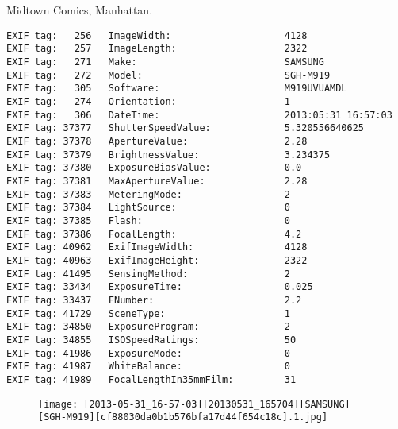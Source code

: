 \section{\protect{}}
\noindent Midtown Comics, Manhattan.
\noindent
\begin{lstlisting}
EXIF tag:   256   ImageWidth:                    4128
EXIF tag:   257   ImageLength:                   2322
EXIF tag:   271   Make:                          SAMSUNG
EXIF tag:   272   Model:                         SGH-M919
EXIF tag:   305   Software:                      M919UVUAMDL
EXIF tag:   274   Orientation:                   1
EXIF tag:   306   DateTime:                      2013:05:31 16:57:03
EXIF tag: 37377   ShutterSpeedValue:             5.320556640625
EXIF tag: 37378   ApertureValue:                 2.28
EXIF tag: 37379   BrightnessValue:               3.234375
EXIF tag: 37380   ExposureBiasValue:             0.0
EXIF tag: 37381   MaxApertureValue:              2.28
EXIF tag: 37383   MeteringMode:                  2
EXIF tag: 37384   LightSource:                   0
EXIF tag: 37385   Flash:                         0
EXIF tag: 37386   FocalLength:                   4.2
EXIF tag: 40962   ExifImageWidth:                4128
EXIF tag: 40963   ExifImageHeight:               2322
EXIF tag: 41495   SensingMethod:                 2
EXIF tag: 33434   ExposureTime:                  0.025
EXIF tag: 33437   FNumber:                       2.2
EXIF tag: 41729   SceneType:                     1
EXIF tag: 34850   ExposureProgram:               2
EXIF tag: 34855   ISOSpeedRatings:               50
EXIF tag: 41986   ExposureMode:                  0
EXIF tag: 41987   WhiteBalance:                  0
EXIF tag: 41989   FocalLengthIn35mmFilm:         31

\end{lstlisting}
\clearpage
\begin{figure}
\raggedleft
\texttt{[image: [2013-05-31\_16-57-03][20130531\_165704][SAMSUNG][SGH-M919][cf88030da0b1b576bfa17d44f654c18c].1.jpg]}
\end{figure}


\clearpage
